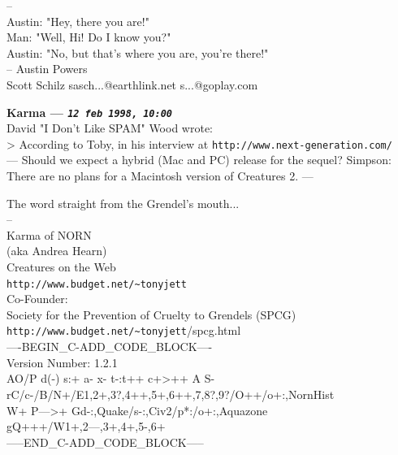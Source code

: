 \documentclass[11pt,twoside,a4paper]{article}
\begin{document}
\begin{multicols*}{2}
-- ~\\
Austin: "Hey, there you are!" ~\\
Man: "Well, Hi! Do I know you?" ~\\
Austin: "No, but that's where you are, you're there!" ~\\
-- Austin Powers ~\\

Scott Schilz sasch...@earthlink.net s...@goplay.com

 
		
	
		
\textbf{Karma --- \emph{\texttt{12 feb 1998, 10:00}}}~\\

David "I Don't Like SPAM" Wood wrote: ~\\
> According to Toby, in his interview at \texttt{http://www.next-generation.com/} ~\\

---
Should we expect a hybrid (Mac and PC) release for the sequel?
Simpson: There are no plans for a Macintosh version of Creatures 2.
---

The word straight from the Grendel's mouth... ~\\
--  ~\\
Karma of NORN ~\\
(aka Andrea Hearn) ~\\

Creatures on the Web ~\\
\texttt{http://www.budget.net/\textasciitilde tonyjett} ~\\

Co-Founder: ~\\
Society for the Prevention of Cruelty to Grendels (SPCG) ~\\
\texttt{http://www.budget.net/\textasciitilde tonyjett}/spcg.html ~\\

----BEGIN\_C-ADD\_CODE\_BLOCK---- ~\\
Version Number: 1.2.1 ~\\
AO/P d(-) s:+ a- x- t-:t++ c+>++ A S- ~\\
rC/c-/B/N+/E1,2+,3?,4++,5+,6++,7,8?,9?/O++/o+:,NornHist ~\\
W+ P--->+ Gd-:,Quake/s-:,Civ2/p*:/o+:,Aquazone ~\\
gQ+++/W1+,2---,3+,4+,5-,6+ ~\\
-----END\_C-ADD\_CODE\_BLOCK----- ~\\

 
		

\end{multicols*}
\end{document}
